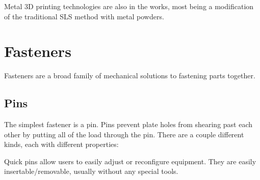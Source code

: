 \documentclass[10pt,letterpaper]{book}
\begin{document}
 	Metal 3D printing technologies are also in the works, most being a modification of the traditional SLS method with metal powders.
 		
	\section{Fasteners}
	Fasteners are a broad family of mechanical solutions to fastening parts together.
	
	\subsection{Pins}
	The simplest fastener is a pin. Pins prevent plate holes from shearing past each other by putting all of the load through the pin. There are a couple different kinds, each with different properties:
	
	Quick pins allow users to easily adjust or reconfigure equipment. They are easily insertable/removable, usually without any special tools.
	
\end{document}
